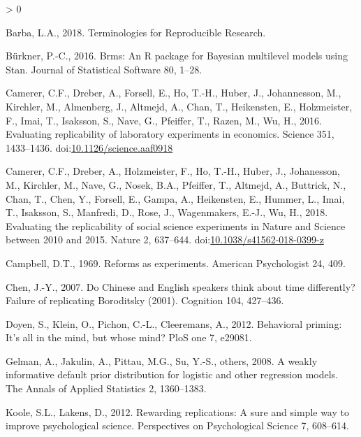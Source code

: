 \documentclass[]{elsarticle} %
\newlength{\cslhangindent}
\newenvironment{CSLReferences}[2] %
 {%
  \setlength{\parindent}{0pt}
  \ifodd #1 \everypar{\setlength{\hangindent}{\cslhangindent}}\ignorespaces\fi
  \ifnum #2 > 0
  \setlength{\parskip}{#2\baselineskip}
  \fi
 }%
 {}
\begin{document}
\hypertarget{refs}{}
\begin{CSLReferences}{1}{0}
\leavevmode\hypertarget{ref-barba_terminologies_2018}{}%
Barba, L.A., 2018. Terminologies for {Reproducible} {Research}.

\leavevmode\hypertarget{ref-burkner_brms_2016}{}%
Bürkner, P.-C., 2016. Brms: {An} {R} package for {Bayesian} multilevel
models using {Stan}. Journal of Statistical Software 80, 1--28.

\leavevmode\hypertarget{ref-camerer_evaluating_2016}{}%
Camerer, C.F., Dreber, A., Forsell, E., Ho, T.-H., Huber, J.,
Johannesson, M., Kirchler, M., Almenberg, J., Altmejd, A., Chan, T.,
Heikensten, E., Holzmeister, F., Imai, T., Isaksson, S., Nave, G.,
Pfeiffer, T., Razen, M., Wu, H., 2016. Evaluating replicability of
laboratory experiments in economics. Science 351, 1433--1436.
doi:\href{https://doi.org/10.1126/science.aaf0918}{10.1126/science.aaf0918}

\leavevmode\hypertarget{ref-camerer_evaluating_2018}{}%
Camerer, C.F., Dreber, A., Holzmeister, F., Ho, T.-H., Huber, J.,
Johanesson, M., Kirchler, M., Nave, G., Nosek, B.A., Pfeiffer, T.,
Altmejd, A., Buttrick, N., Chan, T., Chen, Y., Forsell, E., Gampa, A.,
Heikensten, E., Hummer, L., Imai, T., Isaksson, S., Manfredi, D., Rose,
J., Wagenmakers, E.-J., Wu, H., 2018. Evaluating the replicability of
social science experiments in {Nature} and {Science} between 2010 and
2015. Nature 2, 637--644.
doi:\href{https://doi.org/10.1038/s41562-018-0399-z}{10.1038/s41562-018-0399-z}

\leavevmode\hypertarget{ref-campbell_reforms_1969}{}%
Campbell, D.T., 1969. Reforms as experiments. American Psychologist 24,
409.

\leavevmode\hypertarget{ref-chen_chinese_2007}{}%
Chen, J.-Y., 2007. Do {Chinese} and {English} speakers think about time
differently? {Failure} of replicating {Boroditsky} (2001). Cognition
104, 427--436.

\leavevmode\hypertarget{ref-doyen_behavioral_2012}{}%
Doyen, S., Klein, O., Pichon, C.-L., Cleeremans, A., 2012. Behavioral
priming: It's all in the mind, but whose mind? PloS one 7, e29081.

\leavevmode\hypertarget{ref-gelman_weakly_2008}{}%
Gelman, A., Jakulin, A., Pittau, M.G., Su, Y.-S., others, 2008. A weakly
informative default prior distribution for logistic and other regression
models. The Annals of Applied Statistics 2, 1360--1383.

\leavevmode\hypertarget{ref-koole_rewarding_2012}{}%
Koole, S.L., Lakens, D., 2012. Rewarding replications: {A} sure and
simple way to improve psychological science. Perspectives on
Psychological Science 7, 608--614.


\end{CSLReferences}
\end{document}
